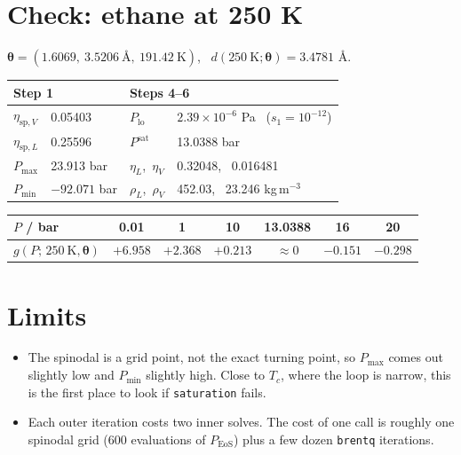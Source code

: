 \documentclass[11pt]{article}
\newcommand{\pth}{\boldsymbol{\theta}}
\newcommand{\Peos}{P_{\mathrm{EoS}}}
\newcommand{\etasv}{\eta_{\mathrm{sp},V}}
\newcommand{\etasl}{\eta_{\mathrm{sp},L}}
\begin{document}
\section{Check: ethane at 250 K}

$\pth = (1.6069,\ 3.5206\ \text{\AA},\ 191.42\ \text{K})$, \ $d(250\ \mathrm{K};\pth) = 3.4781$ \AA.

\begin{center}
\begin{tabular}{ll@{\qquad}ll}
\toprule
\multicolumn{2}{l}{Step 1} & \multicolumn{2}{l}{Steps 4--6} \\
\midrule
$\etasv$ & 0.05403 & $P_{\mathrm{lo}}$ & $2.39\times10^{-6}$ Pa \ ($s_1=10^{-12}$) \\
$\etasl$ & 0.25596 & $P^{\mathrm{sat}}$ & 13.0388 bar \\
$P_{\max}$ & 23.913 bar & $\eta_L$,\ $\eta_V$ & 0.32048, \ 0.016481 \\
$P_{\min}$ & $-92.071$ bar & $\rho_L$,\ $\rho_V$ & 452.03, \ 23.246 kg\,m$^{-3}$ \\
\bottomrule
\end{tabular}
\end{center}

\begin{center}
\begin{tabular}{lcccccc}
\toprule
$P$ / bar & 0.01 & 1 & 10 & 13.0388 & 16 & 20 \\
\midrule
$g(P;\,250\ \mathrm{K},\pth)$ & $+6.958$ & $+2.368$ & $+0.213$ & $\approx 0$ & $-0.151$ & $-0.298$ \\
\bottomrule
\end{tabular}
\end{center}

\section{Limits}

\begin{itemize}
\item The spinodal is a grid point, not the exact turning point, so $P_{\max}$ comes out slightly low and $P_{\min}$ slightly high. Close to $T_c$, where the loop is narrow, this is the first place to look if \texttt{saturation} fails.
\item Each outer iteration costs two inner solves. The cost of one call is roughly one spinodal grid (600 evaluations of $\Peos$) plus a few dozen \texttt{brentq} iterations.
\end{itemize}
\end{document}
